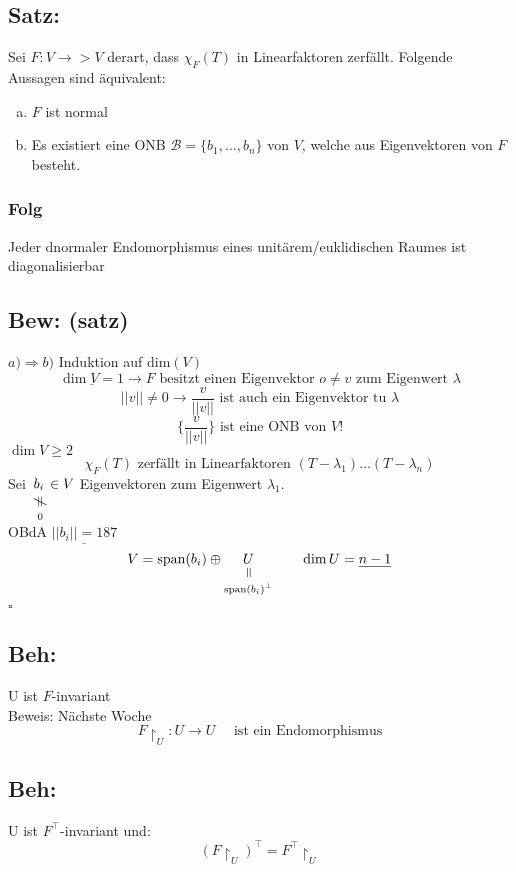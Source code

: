 \documentclass[titlepage,12pt,a4paper,ngerman]{report}
\newenvironment{bew}[1]{\subsection{Bew: #1}}{\hfill$\square$}
\newcommand{\Bew}[2]{\begin{bew}{#1}#2\end{bew}}
\newcommand{\verteq}{\rotatebox{90}{$\,=$}}
\newcommand{\equalto}[2]{\underset{\scriptstyle\overset{\mkern4mu\verteq}{#2}}{#1}}
\newcommand{\custo}[3]{\underset{\scriptstyle\overset{\mkern4mu\rotatebox{-90}{$\,#1$}}{#3}}{#2}}
\newcommand{\tx}[1]{\textrm{#1}}
\newcommand{\spa}{\tx{span}}
\newcommand{\basis}[3]{\{#1_{#2}, \dots, #1_{#3}\}}
\begin{document}
\subsection{Satz:}
Sei $F: V \to >V $ derart, dass $\chi_F(T)$ in Linearfaktoren zerfällt. Folgende Aussagen sind äquivalent:
\begin{enumerate}[a)]
	\item $F$ ist normal
	\item Es existiert eine ONB $ \mathcal B =\basis{b}{1}{n}$ von $V$, welche aus Eigenvektoren von $F$ besteht.
\end{enumerate}
\subsubsection{Folg}
Jeder dnormaler Endomorphismus eines unitärem/euklidischen Raumes ist diagonalisierbar

\Bew{(satz)}{
	$\boxed{a) \Rightarrow b)}$ Induktion auf dim$(V)$ 
	$$\underline{\dim V = 1} \rightarrow F \tx{ besitzt einen Eigenvektor } o \neq v \tx{ zum Eigenwert } \lambda$$
	$$||v|| \neq 0 \rightarrow \frac{v}{||v||} \tx{ ist auch ein Eigenvektor tu }\lambda$$
	$$\bigg \{\frac{v }{||v||} \bigg \} \tx{ ist eine ONB von }V!$$
	$\boxed{\dim V \geq 2}$
	$$\chi_F (T) \tx{ zerfällt in Linearfaktoren } (T- \lambda_1) \dots (T-\lambda_n)$$
	Sei $\custo{\neq \ }{b_i}{\: 0} \in V$ Eigenvektoren zum Eigenwert $\lambda_1$.\\[10pt]
	OBdA $\underline{||b_i|| = 187}$ $$V = \spa (b_i) \oplus \equalto{U}{\spa (b_i)^\perp} \qquad \dim U = \underline{n-1}$$
}

\subsection{Beh:}
U ist $F$-invariant\\
Beweis: Nächste Woche 
$$F \upharpoonright_U : U \to U \quad \tx{ ist ein Endomorphismus}$$
\subsection{Beh:}
U ist $ F^\top $-invariant und:
$$ (F\upharpoonright_U)^\top = F^\top \upharpoonright_U$$
\end{document}
